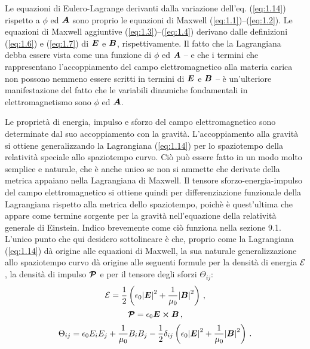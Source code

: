 Le equazioni di Eulero-Lagrange derivanti dalla variazione dell'eq. (\ref{eq:1.14}) rispetto a $\phi$ ed $\vb*{A}$ sono proprio le equazioni di Maxwell (\ref{eq:1.1})--(\ref{eq:1.2}). Le equazioni di Maxwell aggiuntive (\ref{eq:1.3})--(\ref{eq:1.4}) derivano dalle definizioni (\ref{eq:1.6}) e (\ref{eq:1.7}) di $\vb*{E}$ e $\vb*{B}$, rispettivamente. Il fatto che la Lagrangiana debba essere vista come una funzione di $\phi$ ed $\vb*{A}$ -- e che i termini che rappresentano l'accoppiamento del campo elettromagnetico alla materia carica non possono nemmeno essere scritti in termini di $\vb*{E}$ e $\vb*{B}$ -- è un'ulteriore manifestazione del fatto che le variabili dinamiche fondamentali in elettromagnetismo sono $\phi$ ed $\vb*{A}$.

Le proprietà di energia, impulso e sforzo del campo elettromagnetico sono determinate dal suo accoppiamento con la gravità. L'accoppiamento alla gravità si ottiene generalizzando la Lagrangiana (\ref{eq:1.14}) per lo spaziotempo della relatività speciale allo spaziotempo curvo. Ciò può essere fatto in un modo molto semplice e naturale, che è anche unico se non si ammette che derivate della metrica appaiano nella Lagrangiana di Maxwell. Il tensore sforzo-energia-impulso del campo elettromagnetico si ottiene quindi per differenziazione funzionale della Lagrangiana rispetto alla metrica dello spaziotempo, poichè è quest'ultima che appare come termine sorgente per la gravità nell'equazione della relatività generale di Einstein. Indico brevemente come ciò funziona nella sezione 9.1. L'unico punto che qui desidero sottolineare è che, proprio come la Lagrangiana (\ref{eq:1.14}) dà origine alle equazioni di Maxwell, la sua naturale generalizzazione allo spaziotempo curvo dà origine alle seguenti formule per la densità di energia $\mathcal{E}$, la densità di impulso $\vb*{\cP}$ e per il tensore degli sforzi $\Theta_{ij}$:
\begin{equation}\label{eq:1.15}
\cE = \frac{1}{2} \left(\epsilon_0 {\abs{\vb*{E}}}^2 + \frac{1}{\mu_0} {\abs{\vb*{B}}}^2 \right)\,,
\end{equation}
\begin{equation}\label{eq:1.16}
\vb*{\cP} = \epsilon_0 \vb*{E} \cross \vb*{B}\,,
\end{equation}
\begin{equation}\label{eq:1.17}
\Theta_{ij} =  \epsilon_0 E_iE_j + \frac{1}{\mu_0} B_iB_j
- \frac{1}{2} \delta_{ij} \left(\epsilon_0 {\abs{\vb*{E}}}^2 + \frac{1}{\mu_0} {\abs{\vb*{B}}}^2 \right)\,.
\end{equation}
